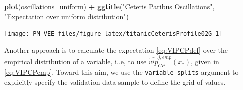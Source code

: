 \documentclass[12pt,]{krantz}
\newenvironment{Shaded}{\begin{snugshade}}{\end{snugshade}}
\newcommand{\DataTypeTok}[1]{\textcolor[rgb]{0.13,0.29,0.53}{#1}}
\newcommand{\KeywordTok}[1]{\textcolor[rgb]{0.13,0.29,0.53}{\textbf{#1}}}
\newcommand{\NormalTok}[1]{#1}
\newcommand{\OperatorTok}[1]{\textcolor[rgb]{0.81,0.36,0.00}{\textbf{#1}}}
\newcommand{\StringTok}[1]{\textcolor[rgb]{0.31,0.60,0.02}{#1}}
\begin{document}
\begin{Shaded}
\begin{Highlighting}[]
\KeywordTok{plot}\NormalTok{(oscillations_uniform) }\OperatorTok{+}\StringTok{ }\KeywordTok{ggtitle}\NormalTok{(}\StringTok{"Ceteris Paribus Oscillations"}\NormalTok{, }\StringTok{"Expectation over uniform distribution"}\NormalTok{)}
\end{Highlighting}
\end{Shaded}

\begin{center}\texttt{[image: PM\_VEE\_files/figure-latex/titanicCeterisProfile02G-1]} \end{center}

Another approach is to calculate the expectation \eqref{eq:VIPCPdef} over the empirical distribution of a variable, i..e, to use \(\widehat{vip}_{CP}^{j,emp}(x_*)\), given in \eqref{eq:VIPCPemp}. Toward this aim, we use the \texttt{variable\_splits} argument to explicitly specify the validation-data sample to define the grid of values.

\begin{Shaded}
\end{Shaded}

\begin{Shaded}
\end{Shaded}
\end{document}
